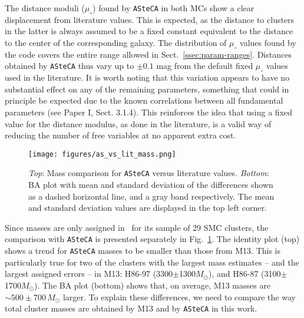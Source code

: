 \documentclass{aa}
\begin{document}
The distance moduli ($\mu_{\circ}$) found by \texttt{ASteCA} in both MCs
show a clear displacement from literature values. This is expected, as the
distance to clusters in the latter is always assumed to be a fixed constant
equivalent to the distance to the center of the corresponding galaxy.
The distribution of $\mu_{\circ}$ values found by the code covers the entire
range allowed in Sect.~\ref{ssec:param-ranges}. Distances obtained by
\texttt{ASteCA} thus vary up to ${\pm}0.1$ mag from the default fixed
$\mu_{\circ}$ values used in the literature.
%
It is worth noting that this variation appears to have no substantial effect on
any of the remaining parameters, something that could in principle be expected
due to the known correlations between all fundamental parameters (see Paper I,
Sect. 3.1.4).
This reinforces the idea that using a fixed value for the distance modulus, as
done in the literature, is a valid way of reducing the number of free variables
at no apparent extra cost.\\

\begin{figure}
\centering
\texttt{[image: figures/as\_vs\_lit\_mass.png]}
\caption{\emph{Top}: Mass comparison for \texttt{ASteCA} versus literature
values.
\emph{Bottom}: BA plot with mean and standard deviation of the differences
shown as a dashed horizontal line, and a gray band respectively. The mean and
standard deviation values are displayed in the top left corner.}
\label{fig:as_vs_lit_mass}
\end{figure}

Since masses are only assigned in~\citet[][M13]{Maia_2013} for its sample of 29
SMC clusters, the comparison with \texttt{ASteCA} is presented separately in
Fig.~\ref{fig:as_vs_lit_mass}.
%
The identity plot (top) shows a trend for \texttt{ASteCA} masses to be smaller
than those from M13. This is particularly true for two of the clusters with
the largest mass estimates -- and the largest assigned errors -- in M13:
H86-97 (3300$\pm$1300$M_{\odot}$), and H86-87
(3100$\pm$1700$M_{\odot}$). The BA plot (bottom) shows that, on average, M13
masses are ${\sim}500{\pm}700\,M_{\odot}$ larger.
%
To explain these differences, we need to compare the way total cluster masses
are obtained by M13 and by \texttt{ASteCA} in this work.
\end{document}
